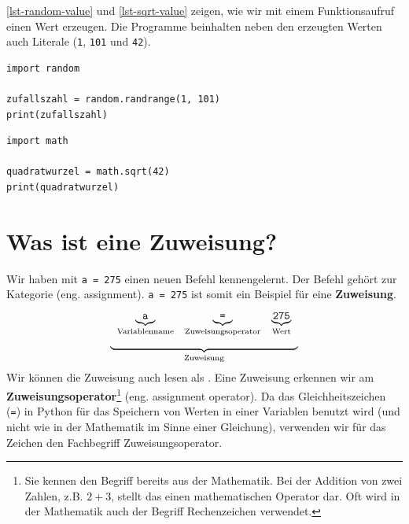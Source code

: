 \begin{example}

\autoref{lst-random-value} und \autoref{lst-sqrt-value} zeigen, wie wir mit einem Funktionsaufruf einen Wert erzeugen. Die Programme beinhalten neben den erzeugten Werten auch Literale (\lstinline{1}, \lstinline{101} und \lstinline{42}). 

\begin{lstlisting}[caption={Erzeugt eine Zufallszahl zwischen $1$ und $100$ und gibt diese dann in der Konsole aus.}, label={lst-random-value}]
import random

zufallszahl = random.randrange(1, 101)
print(zufallszahl)
\end{lstlisting}
	
\begin{lstlisting}[caption={Berechnet die Quadratwurzel aus $42$ und gibt diese dann in der Konsole aus.}, label={lst-sqrt-value}]
import math

quadratwurzel = math.sqrt(42)
print(quadratwurzel)
	\end{lstlisting}
\end{example}

\section{Was ist eine Zuweisung?}

Wir haben mit \lstinline{a = 275} einen neuen Befehl kennengelernt. Der Befehl gehört zur Kategorie  (eng. assignment). \lstinline{a = 275} ist somit ein Beispiel für eine \textbf{Zuweisung}.
$$
\begin{array}[t]{c}
\begin{array}[t]{ccc} 
\underbrace{\textrm{\texttt{a}}}_{\textrm{Variablenname}} & \underbrace{\textrm{\texttt{=}}}_{\textrm{Zuweisungsoperator}} & \underbrace{\textrm{\texttt{275}}}_{\textrm{Wert}}
\end{array} \\
\underbrace{\hspace{6cm}}_{\textrm{Zuweisung}}
\end{array}
$$
Wir können die Zuweisung auch lesen als . Eine Zuweisung erkennen wir am \textbf{Zuweisungsoperator}\footnote{Sie kennen den Begriff bereits aus der Mathematik. Bei der Addition von zwei Zahlen, z.B. $2 + 3$, stellt das  einen mathematischen Operator dar. Oft wird in der Mathematik auch der Begriff Rechenzeichen verwendet.} (eng. assignment operator). Da das Gleichheitszeichen (\lstinline{=}) in Python für das Speichern von Werten in einer Variablen benutzt wird (und nicht wie in der Mathematik im Sinne einer Gleichung), verwenden wir für das Zeichen den Fachbegriff Zuweisungsoperator.

